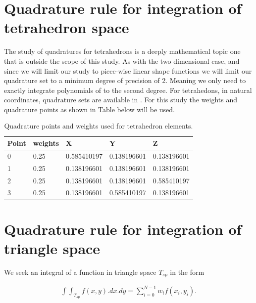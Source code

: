 \documentclass[11pt,letterpaper,titlepage]{article}
\newcommand{\beq}{\begin{equation*}
\begin{aligned}}
\newcommand{\eeq}{\end{aligned}
\end{equation*}}
\begin{document}
\newpage
{}
\begin{appendices}
\renewcommand{\thefigure}{D\arabic{section}.\arabic{figure}}
\section{Quadrature rule for integration of tetrahedron space} \label{appendix:tetrahedronquadrature}
The study of quadratures for tetrahedrons is a deeply mathematical topic one that is outside the scope of this study. As with the two dimensional case, and since we will limit our study to piece-wise linear shape functions we will limit our quadrature set to a minimum degree of precision of 2. Meaning we only need to exactly integrate polynomials of to the second degree. For tetrahedons, in natural coordinates, quadrature sets are available in \cite{quadraturerulestet}. For this study the weights and quadrature points as shown in Table below will be used.

\begin{table}[H] \label{tbl:qpointstet}
\centering
\begin{tabular}{|l|l|l|l|l|}
\hline
\textbf{Point} & \textbf{weights} & \textbf{X}  & \textbf{Y}  & \textbf{Z}  \\ \hline
0              & 0.25             & 0.585410197 & 0.138196601 & 0.138196601 \\ \hline
1              & 0.25             & 0.138196601 & 0.138196601 & 0.138196601 \\ \hline
2              & 0.25             & 0.138196601 & 0.138196601 & 0.585410197 \\ \hline
3              & 0.25             & 0.138196601 & 0.585410197 & 0.138196601 \\ \hline
\end{tabular}
\caption{Quadrature points and weights used for tetrahedron elements.}
\end{table}

\newpage 
{}
\section{Quadrature rule for integration of triangle space} \label{appendix:trianglequadrature}
We seek an integral of a function in triangle space $T_{sp}$ in the form

\beq 
\int \int_{T_{sp}} f(x,y).dx.dy = \sum_{i=0}^{N-1} w_i f(x_i,y_i).
\eeq 


\end{appendices}
\end{document}
